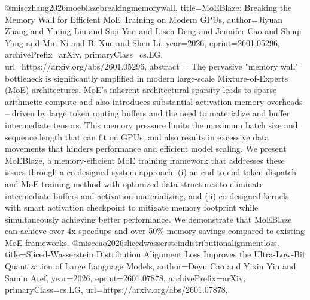 {}@misc{zhang2026moeblazebreakingmemorywall,
      title={MoEBlaze: Breaking the Memory Wall for Efficient MoE Training on Modern GPUs}, 
      author={Jiyuan Zhang and Yining Liu and Siqi Yan and Lisen Deng and Jennifer Cao and Shuqi Yang and Min Ni and Bi Xue and Shen Li},
      year={2026},
      eprint={2601.05296},
      archivePrefix={arXiv},
      primaryClass={cs.LG},
      url={https://arxiv.org/abs/2601.05296},
      abstract = {The pervasive "memory wall" bottleneck is significantly amplified in modern large-scale Mixture-of-Experts (MoE) architectures. MoE's inherent architectural sparsity leads to sparse arithmetic compute and also introduces substantial activation memory overheads -- driven by large token routing buffers and the need to materialize and buffer intermediate tensors. This memory pressure limits the maximum batch size and sequence length that can fit on GPUs, and also results in excessive data movements that hinders performance and efficient model scaling. We present MoEBlaze, a memory-efficient MoE training framework that addresses these issues through a co-designed system approach: (i) an end-to-end token dispatch and MoE training method with optimized data structures to eliminate intermediate buffers and activation materializing, and (ii) co-designed kernels with smart activation checkpoint to mitigate memory footprint while simultaneously achieving better performance. We demonstrate that MoEBlaze can achieve over 4x speedups and over 50\% memory savings compared to existing MoE frameworks.}
}@misc{cao2026slicedwassersteindistributionalignmentloss,
      title={Sliced-Wasserstein Distribution Alignment Loss Improves the Ultra-Low-Bit Quantization of Large Language Models}, 
      author={Deyu Cao and Yixin Yin and Samin Aref},
      year={2026},
      eprint={2601.07878},
      archivePrefix={arXiv},
      primaryClass={cs.LG},
      url={https://arxiv.org/abs/2601.07878},
}
